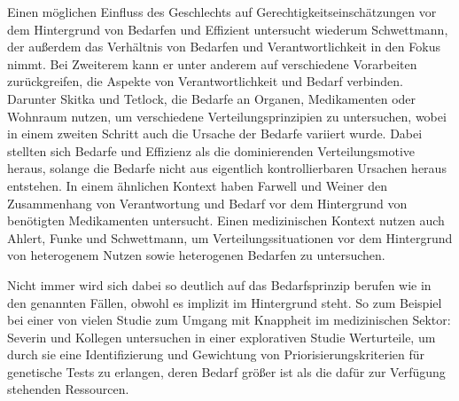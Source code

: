 \documentclass[a4paper]{thesis}
\begin{document}
Einen möglichen Einfluss des Geschlechts auf Gerechtigkeitseinschätzungen vor dem Hintergrund von Bedarfen und Effizient untersucht wiederum Schwettmann, der außerdem das Verhältnis von Bedarfen und Verantwortlichkeit in den Fokus nimmt. Bei Zweiterem kann er unter anderem auf verschiedene Vorarbeiten zurückgreifen, die Aspekte von Verantwortlichkeit und Bedarf verbinden. Darunter Skitka und Tetlock, die Bedarfe an Organen, Medikamenten oder Wohnraum nutzen, um verschiedene Verteilungsprinzipien zu untersuchen, wobei in einem zweiten Schritt auch die Ursache der Bedarfe variiert wurde. Dabei stellten sich Bedarfe und Effizienz als die dominierenden Verteilungsmotive heraus, solange die Bedarfe nicht aus eigentlich kontrollierbaren Ursachen heraus entstehen. In einem ähnlichen Kontext haben Farwell und Weiner den Zusammenhang von Verantwortung und Bedarf vor dem Hintergrund von benötigten Medikamenten untersucht. Einen medizinischen Kontext nutzen auch Ahlert, Funke und Schwettmann, um Verteilungssituationen vor dem Hintergrund von heterogenem Nutzen sowie heterogenen Bedarfen zu untersuchen.

Nicht immer wird sich dabei so deutlich auf das Bedarfsprinzip berufen wie in den genannten Fällen, obwohl es implizit im Hintergrund steht. So zum Beispiel bei einer von vielen Studie zum Umgang mit Knappheit im medizinischen Sektor: Severin und Kollegen untersuchen in einer explorativen Studie Werturteile, um durch sie eine Identifizierung und Gewichtung von Priorisierungskriterien für genetische Tests zu erlangen, deren Bedarf größer ist als die dafür zur Verfügung stehenden Ressourcen.
\end{document}
